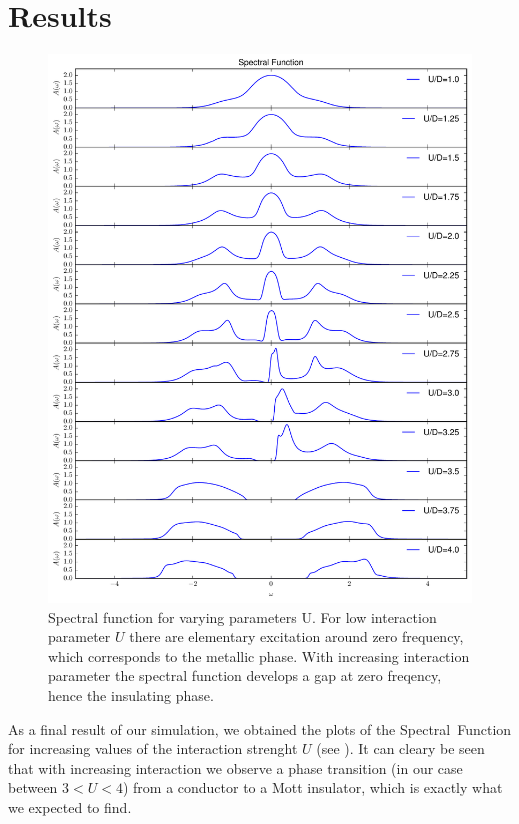 \section{Results}
\begin{figure}[b]
	\centering
	\includegraphics[width=\textwidth ]{Mott_transition}
	\caption{Spectral function for varying parameters U. For low interaction parameter $U$ there are elementary excitation around zero frequency, which corresponds to the metallic phase. With increasing interaction parameter the spectral function develops a gap at zero freqency, hence the insulating phase.}
	\label{fig:spectralf}
\end{figure}
As a final result of our simulation, we obtained the plots of the Spectral~Function for increasing values of the interaction strenght $U$ (see ).
It can cleary be seen that with increasing interaction we observe a phase transition (in our case between $3<U<4$) from a conductor to a Mott insulator, which is exactly what we expected to find. 

